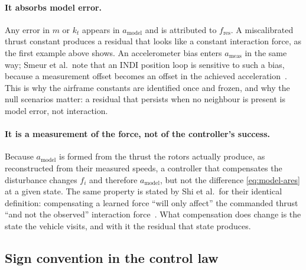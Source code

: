\paragraph{It absorbs model error.} Any error in $m$ or $k_t$ appears in $a_{\mathrm{model}}$ and is
attributed to $f_{\mathrm{res}}$. A miscalibrated thrust constant produces a residual that looks
like a constant interaction force, as the first example above shows.
An accelerometer bias enters $a_{\mathrm{meas}}$ in the same way; Smeur et al.\ note that an INDI
position loop is sensitive to such a bias, because a measurement offset becomes an offset in the
achieved acceleration~\cite{smeur2017cascadedindi}.
This is why the airframe constants are identified once and
frozen, and why the null scenarios matter: a residual that persists when no neighbour is present is
model error, not interaction.

\paragraph{It is a measurement of the force, not of the controller's success.} Because
$a_{\mathrm{model}}$ is formed from the thrust the rotors actually produce, as reconstructed from
their measured speeds, a controller that compensates the disturbance changes $f_i$ and therefore
$a_{\mathrm{model}}$, but not the difference \eqref{eq:model-ares} at a given state. The same
property is stated by Shi et al.\ for their identical definition: compensating a learned force
``will only affect'' the commanded thrust ``and not the observed'' interaction
force~\cite{shi2020neuralswarm}. What compensation does change is the state the vehicle visits,
and with it the residual that state produces.

\subsection{Sign convention in the control law}
\label{sec:model-sign}

